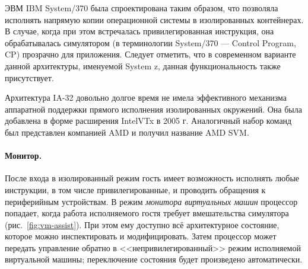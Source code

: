 ЭВМ IBM System/370 была спроектирована таким образом, что позволяла исполнять напрямую копии операционной системы в изолированных контейнерах. В случае, когда при этом встречалась привилегированная инструкция, она обрабатывалась симулятором (в терминологии System/370 --- Control Program, CP) прозрачно для приложения. Следует отметить, что в современном варианте данной архитектуры, именуемой System z, данная функциональность также присутствует. 

Архитектура IA-32 довольно долгое время не имела эффективного механизма аппаратной поддержки прямого исполнения изолированных окружений. Она была добавлена в форме расширения Intel\textregistered VTx в 2005 г. Аналогичный набор команд был представлен компанией AMD и получил название AMD SVM.

\paragraph{Монитор.}
После входа в изолированный режим гость имеет возможность исполнять любые инструкции, в том числе привилегированные, и проводить обращения к периферийным устройствам. 
В режим \textit{монитора виртуальных машин} процессор попадает, когда работа исполняемого гостя требует вмешательства симулятора (рис.~\ref{fig:vm-assist}). При этом ему доступно всё архитектурное состояние, которое можно инспектировать и модифицировать. Затем процессор может передать управление обратно в <<непривилегированный>> режим исполняемой виртуальной машины; переключение состояния будет произведено автоматически.

